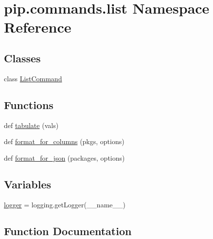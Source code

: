 \hypertarget{namespacepip_1_1commands_1_1list}{}\section{pip.\+commands.\+list Namespace Reference}
\label{namespacepip_1_1commands_1_1list}
\subsection*{Classes}
\begin{DoxyCompactItemize}
\item 
class \hyperlink{classpip_1_1commands_1_1list_1_1_list_command}{List\+Command}
\end{DoxyCompactItemize}
\subsection*{Functions}
\begin{DoxyCompactItemize}
\item 
def \hyperlink{namespacepip_1_1commands_1_1list_a828a23c945549303dc37dab4964f32c5}{tabulate} (vals)
\item 
def \hyperlink{namespacepip_1_1commands_1_1list_a197585854739e5e7c6d02d3eb3e55eeb}{format\+\_\+for\+\_\+columns} (pkgs, options)
\item 
def \hyperlink{namespacepip_1_1commands_1_1list_a94998218d23a2605a7c1ac3c849260c7}{format\+\_\+for\+\_\+json} (packages, options)
\end{DoxyCompactItemize}
\subsection*{Variables}
\begin{DoxyCompactItemize}
\item 
\hyperlink{namespacepip_1_1commands_1_1list_ad49708b52e0eb8edc5402ed90ee69fe0}{logger} = logging.\+get\+Logger(\+\_\+\+\_\+name\+\_\+\+\_\+)
\end{DoxyCompactItemize}


\subsection{Function Documentation}
\mbox{\label{namespacepip_1_1commands_1_1list_a197585854739e5e7c6d02d3eb3e55eeb}} 
